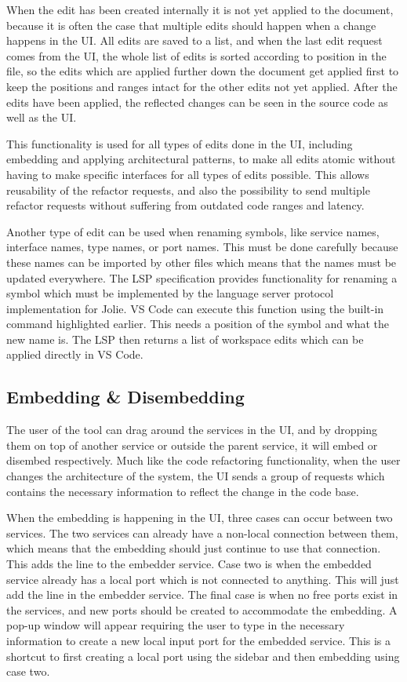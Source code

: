 When the edit has been created internally it is not yet applied to the document, because it is often the case that multiple edits should happen when a change happens in the UI.
All edits are saved to a list, and when the last edit request comes from the UI, the whole list of edits is sorted according to position in the file, so the edits which are applied further down the document get applied first to keep the positions and ranges intact for the other edits not yet applied.
After the edits have been applied, the reflected changes can be seen in the source code as well as the UI.

This functionality is used for all types of edits done in the UI, including embedding and applying architectural patterns, to make all edits atomic without having to make specific interfaces for all types of edits possible. 
This allows reusability of the refactor requests, and also the possibility to send multiple refactor requests without suffering from outdated code ranges and latency.

Another type of edit can be used when renaming symbols, like service names, interface names, type names, or port names. This must be done carefully because these names can be imported by other files which means that the names must be updated everywhere.
The LSP specification provides functionality for renaming a symbol which must be implemented by the language server protocol implementation for Jolie.
VS Code can execute this function using the built-in command highlighted earlier. This needs a position of the symbol and what the new name is. The LSP then returns a list of workspace edits which can be applied directly in VS Code.

\subsection{Embedding \& Disembedding}
The user of the tool can drag around the services in the UI, and by dropping them on top of another service or outside the parent service, it will embed or disembed respectively.
Much like the code refactoring functionality, when the user changes the architecture of the system, the UI sends a group of requests which contains the necessary information to reflect the change in the code base.

When the embedding is happening in the UI, three cases can occur between two services. The two services can already have a non-local connection between them, which means that the embedding should just continue to use that connection. This adds the line  to the embedder service.
Case two is when the embedded service already has a local port which is not connected to anything. This will just add the line  in the embedder service.
The final case is when no free ports exist in the services, and new ports should be created to accommodate the embedding. A pop-up window will appear requiring the user to 
type in the necessary information to create a new local input port for the embedded service. This is a shortcut to first creating a local port using the sidebar and then embedding using case two.

